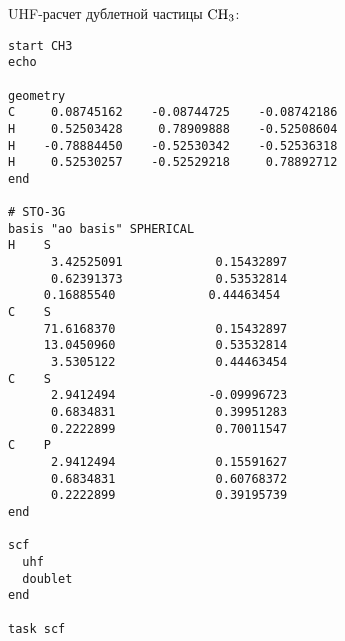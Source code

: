 \documentclass[a4paper, 12pt]{article}
\begin{document}
UHF-расчет дублетной частицы $\rm CH_3$:
\begin{lstlisting}
start CH3
echo

geometry
C     0.08745162    -0.08744725    -0.08742186
H     0.52503428     0.78909888    -0.52508604
H    -0.78884450    -0.52530342    -0.52536318
H     0.52530257    -0.52529218     0.78892712
end

# STO-3G
basis "ao basis" SPHERICAL
H    S
      3.42525091             0.15432897       
      0.62391373             0.53532814       
     0.16885540             0.44463454  
C    S
     71.6168370              0.15432897       
     13.0450960              0.53532814       
      3.5305122              0.44463454       
C    S
      2.9412494             -0.09996723
      0.6834831              0.39951283    
      0.2222899              0.70011547            
C    P
      2.9412494              0.15591627       
      0.6834831              0.60768372       
      0.2222899              0.39195739    
end

scf
  uhf
  doublet
end

task scf
\end{lstlisting}

\clearpage


{}
\end{document}
